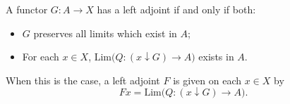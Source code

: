 A functor $G: A \to X$ has a left adjoint if and only if both:
\begin{itemize}
\item[(i)] $G$ preserves all limits which exist in $A$;
\item[(ii)] For each $x \in X$, $\mathrm{Lim}\big(Q: (x \downarrow G) \to A\big)$ exists in $A$.
\end{itemize}
When this is the case, a left adjoint $F$ is given on each $x \in X$ by
$$Fx = \mathrm{Lim}\big(Q: (x \downarrow G) \to A\big).$$

